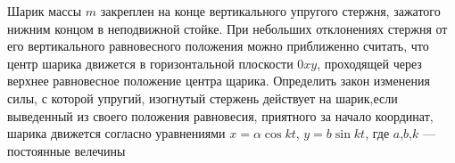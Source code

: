 Шарик массы $m$ закреплен на конце вертикального упругого стержня,
зажатого нижним концом в неподвижной стойке.
При небольших отклонениях стержня от его вертикального
равновесного положения можно приближенно считать, что центр
шарика движется в горизонтальной плоскости $0xy$, проходящей через
верхнее равновесное положение центра щарика.
Определить закон изменения силы, с которой упругий, изогнутый стержень
действует на шарик,если выведенный из своего положения равновесия, 
приятного за начало координат, шарика движется согласно уравнениями
$x=\alpha\cos kt$, $y=b\sin kt$, где $a$,$b$,$k$ --- постоянные велечины
